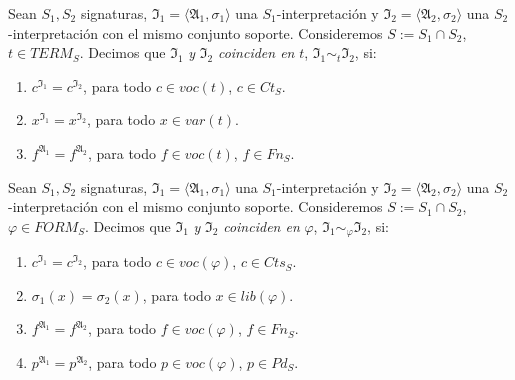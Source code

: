 \begin{definition}
Sean $S_1, S_2$ signaturas, $\mathfrak{I}_{1} = \langle \mathfrak{A}_1, \sigma_1 \rangle$ una $S_1$-interpretación y $\mathfrak{I}_{2} = \langle \mathfrak{A}_2, \sigma_2 \rangle$ una $S_2$-interpretación con el mismo conjunto soporte. Consideremos $S := S_1 \cap S_2$, $t \in TERM_S$. Decimos que $\mathfrak{I}_{1}$ \textit{y} $\mathfrak{I}_{2}$ \textit{coinciden en} $t$, $\mathfrak{I}_{1} \sim_{t} \mathfrak{I}_{2}$, si:
\begin{enumerate}
    \item $c^{\mathfrak{I}_{1}} = c^{\mathfrak{I}_{2}}$, para todo $c \in voc(t)$, $c \in Ct_S$.
    \item $x^{\mathfrak{I}_{1}} = x^{\mathfrak{I}_{2}}$, para todo $x \in var(t)$.
    \item $f^{\mathfrak{A}_{1}} = f^{\mathfrak{A}_{2}}$, para todo $f \in voc(t)$, $f \in Fn_S$.
\end{enumerate}
\end{definition}

\begin{definition}
Sean $S_1, S_2$ signaturas, $\mathfrak{I}_{1} = \langle \mathfrak{A}_1, \sigma_1 \rangle$ una $S_1$-interpretación y $\mathfrak{I}_{2} = \langle \mathfrak{A}_2, \sigma_2 \rangle$ una $S_2$-interpretación con el mismo conjunto soporte. Consideremos $S := S_1 \cap S_2$, $ \varphi \in FORM_S$. Decimos que $\mathfrak{I}_{1}$ \textit{y} $\mathfrak{I}_{2}$ \textit{coinciden en} $\varphi$, $\mathfrak{I}_{1} \sim_{\varphi} \mathfrak{I}_{2}$, si:
\begin{enumerate}
    \item $c^{\mathfrak{I}_{1}} = c^{\mathfrak{I}_{2}}$, para todo $c \in voc(\varphi)$, $c \in Cts_S$.
    \item $\sigma_1(x) = \sigma_2(x)$, para todo $x \in lib(\varphi)$.
    \item $f^{\mathfrak{A}_{1}} = f^{\mathfrak{A}_{2}}$, para todo $f \in voc(\varphi)$, $f \in Fn_S$.
    \item $p^{\mathfrak{A}_{1}} = p^{\mathfrak{A}_{2}}$, para todo $p \in voc(\varphi)$, $p \in Pd_S$.
\end{enumerate}
\end{definition}


